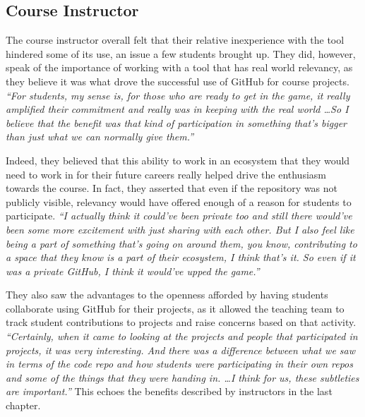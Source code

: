 \subsection{Course Instructor}
The course instructor overall felt that their relative inexperience with the tool hindered some of its use, an issue a few students brought up. They did, however, speak of the importance of working with a tool that has real world relevancy, as they believe it was what drove the successful use of GitHub for course projects. \textit{``For students, my sense is, for those who are ready to get in the game, it really amplified their commitment and really was in keeping with the real world \ldots So I believe that the benefit was that kind of participation in something that's bigger than just what we can normally give them.''}


Indeed, they believed that this ability to work in an ecosystem that they would need to work in for their future careers really helped drive the enthusiasm towards the course. In fact, they asserted that even if the repository was not publicly visible, relevancy would have offered enough of a reason for students to participate. \textit{``I actually think it could've been private too and still there would've been some more excitement with just sharing with each other. But I also feel like being a part of something that's going on around them, you know, contributing to a space that they know is a part of their ecosystem, I think that's it. So even if it was a private GitHub, I think it would've upped the game.''}


They also saw the advantages to the openness afforded by having students collaborate using GitHub for their projects, as it allowed the teaching team to track student contributions to projects and raise concerns based on that activity. \textit{``Certainly, when it came to looking at the projects and people that participated in projects, it was very interesting. And there was a difference between what we saw in terms of the code repo and how students were participating in their own repos and some of the things that they were handing in. \ldots I think for us, these subtleties are important.''}
This echoes the benefits described by instructors in the last chapter.

